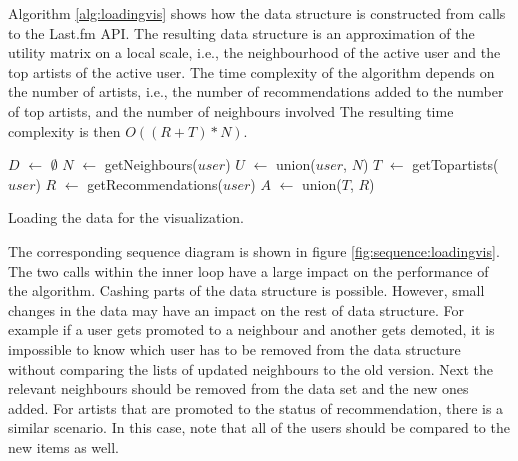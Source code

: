 Algorithm \ref{alg:loadingvis} shows how the data structure is constructed from calls to the Last.fm API. The resulting data structure is an approximation of the utility matrix on a local scale, i.e., the neighbourhood of the active user and the top artists of the active user. The time complexity of the algorithm depends on the number of artists, i.e., the number of recommendations added to the number of top artists, and the number of neighbours involved The resulting time complexity is then $O((R + T) * N)$.


\begin{algorithm}[H]
		\SetAlgoLined
		$D$ $\leftarrow$ $\emptyset$ \;
		$N$ $\leftarrow$ getNeighbours($user$)\;
		$U$ $\leftarrow$ union($user$, $N$)\;
		$T$ $\leftarrow$ getTopartists($user$)\;
		$R$ $\leftarrow$ getRecommendations($user$)\;
		$A$ $\leftarrow$ union($T$, $R$)\;
	\caption{Loading the data for the visualization.}
	\label{alg:loadingvis}
\end{algorithm}


The corresponding sequence diagram is shown in figure \ref{fig:sequence:loadingvis}. The two calls within the inner loop have a large impact on the performance of the algorithm. Cashing parts of the data structure is possible. However, small changes in the data may have an impact on the rest of data structure. For example if a user gets promoted to a neighbour and another gets demoted, it is impossible to know which user has to be removed from the data structure without comparing the lists of updated neighbours to the old version. Next the relevant neighbours should be removed from the data set and the new ones added. For artists that are promoted to the status of recommendation, there is a similar scenario. In this case, note that all of the users should be compared to the new items as well.


